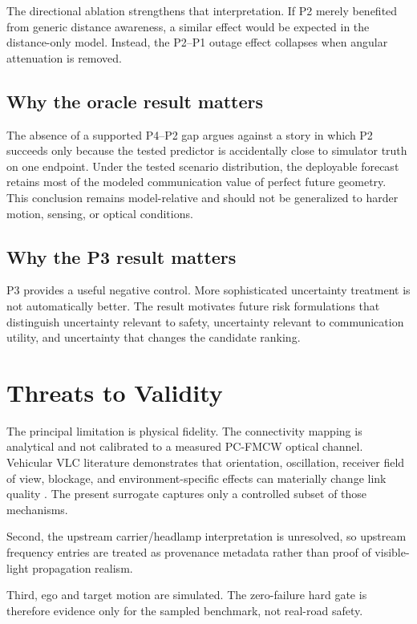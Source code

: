 \documentclass[journal]{IEEEtran}
\begin{document}
The directional ablation strengthens that interpretation. If P2 merely benefited from generic distance awareness, a similar effect would be expected in the distance-only model. Instead, the P2--P1 outage effect collapses when angular attenuation is removed.

\subsection{Why the oracle result matters}
The absence of a supported P4--P2 gap argues against a story in which P2 succeeds only because the tested predictor is accidentally close to simulator truth on one endpoint. Under the tested scenario distribution, the deployable forecast retains most of the modeled communication value of perfect future geometry. This conclusion remains model-relative and should not be generalized to harder motion, sensing, or optical conditions.

\subsection{Why the P3 result matters}
P3 provides a useful negative control. More sophisticated uncertainty treatment is not automatically better. The result motivates future risk formulations that distinguish uncertainty relevant to safety, uncertainty relevant to communication utility, and uncertainty that changes the candidate ranking.

\section{Threats to Validity}
The principal limitation is physical fidelity. The connectivity mapping is analytical and not calibrated to a measured PC-FMCW optical channel. Vehicular VLC literature demonstrates that orientation, oscillation, receiver field of view, blockage, and environment-specific effects can materially change link quality \cite{karbalayghareh2020,turan2021,mohamed2023,avatamanitei2024}. The present surrogate captures only a controlled subset of those mechanisms.

Second, the upstream carrier/headlamp interpretation is unresolved, so upstream frequency entries are treated as provenance metadata rather than proof of visible-light propagation realism.

Third, ego and target motion are simulated. The zero-failure hard gate is therefore evidence only for the sampled benchmark, not real-road safety.
\end{document}
